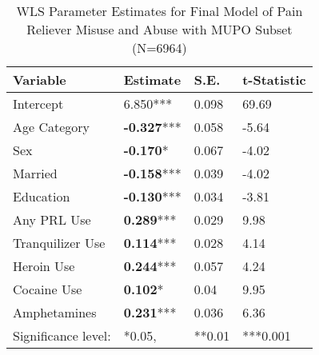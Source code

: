\documentclass[sigconf]{acmart}
\begin{document}
\begin{table}
  \caption{WLS Parameter Estimates for Final Model of Pain Reliever Misuse and 
  Abuse with MUPO Subset (N=6964)}
  \label{tab:freq}
  \begin{tabular}{llll}
    \toprule
    Variable & Estimate& S.E.& t-Statistic \\
    \midrule
    Intercept& 6.850***& 0.098& 69.69 \\
    Age Category& \textbf{-0.327}***& 0.058& -5.64 \\
    Sex& \textbf{-0.170}*& 0.067& -4.02 \\
    Married& \textbf{-0.158}***& 0.039& -4.02 \\
    Education& \textbf{-0.130}***& 0.034& -3.81 \\
    Any PRL Use& \textbf{0.289}***& 0.029& 9.98 \\
    Tranquilizer Use& \textbf{0.114}***& 0.028& 4.14 \\
    Heroin Use& \textbf{0.244}***& 0.057& 4.24 \\
    Cocaine Use& \textbf{0.102}*& 0.04& 9.95 \\
    Amphetamines& \textbf{0.231}***& 0.036& 6.36 \\
    \bottomrule
    Significance level:& *0.05,& **0.01& ***0.001
  \end{tabular}
\end{table}

\end{document}
